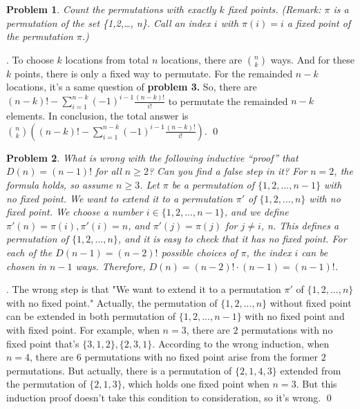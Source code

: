 \documentclass[12pt]{article}
\newtheorem{hw}{Problem}
\newenvironment{sol}
  {\par\vspace{3mm}\noindent{\it Solution}.}
  {\qed}
\begin{document}
\begin{hw}
Count the permutations with exactly $k$ fixed points.  (Remark: $\pi$ is a permutation of the set \{1,2,\ldots, n\}. Call an index $i$ with $\pi(i)=i$ a \emph{fixed point} of the permutation $\pi$.)
\end{hw}

\begin{sol}
    To choose $k$ locations from total $n$ locations, there are $\binom{n}{k} $ ways. And for these $k$ points, there is only a fixed way to permutate. For the remainded $n-k$ locations, it's a same question of \textbf{problem 3.}
    So, there are $(n-k)!-\sum_{i = 1}^{n-k} (-1)^{i-1} \frac{(n-k)!}{i!}$ to permutate the remainded $n-k$ elements. In conclusion, the total answer is $\binom{n}{k} ((n-k)!-\sum_{i = 1}^{n-k} (-1)^{i-1} \frac{(n-k)!}{i!})$.
\end{sol}

\begin{hw}
What is wrong with the following inductive “proof” that $D(n) =
(n-1)!$ for all $n \geq 2$? Can you find a false step in it? For $n = 2$,
the formula holds, so assume $n \geq 3$. Let $\pi$ be a permutation of
$\{1, 2, . . . , n-1\}$ with no fixed point. We want to extend it to a permutation
$\pi'$ of $\{1, 2, . . . , n\}$ with no fixed point. We choose a number
$i \in \{1, 2, . . . , n-1\}$, and we define $\pi'(n) = \pi(i), \pi'(i) = n$, and $\pi'(j) = \pi(j)$ for $j\neq i$, n. This defines a permutation of $\{1, 2, . . . , n\}$, and it is easy
to check that it has no fixed point. For each of the $D(n-1) = (n-2)!$
possible choices of $\pi$, the index $i$ can be chosen in $n-1$ ways. Therefore,
$D(n) = (n-2)! \cdot (n-1) = (n-1)!$.
\end{hw}

\begin{sol}
    The wrong step is that "We want to extend it to a permutation $\pi'$ of $\{1, 2, . . . , n\}$ with no fixed point." Actually, the permutation of $\{1, 2, . . . , n\}$ without fixed point can be extended in both permutation of
    $\{1, 2, . . . , n-1\}$ with no fixed point and with fixed point. For example, when $n=3$, there are $2$ permutations with no fixed point that's $\{3,1,2\},\{2,3,1\}$. According to the wrong induction, when $n=4$, there are $6$ permutations with no fixed point arise from the former $2$ permutations.
    But actually, there is a permutation of $\{2,1,4,3\}$ extended from the permutation of $\{2,1,3\}$, which holds one fixed point when $n=3$. But this induction proof doesn't take this condition to consideration, so it's wrong.
\end{sol} 
\end{document}
